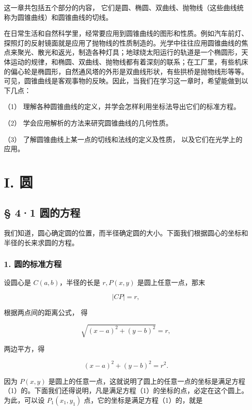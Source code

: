 这一章共包括五个部分的内容，
它们是圆、椭圆、双曲线、抛物线（这些曲线统称为圆锥曲线）和圆锥曲线的切线。

在日常生活和自然科学里，经常要应用到圆锥曲线的图形和性质。例如汽车前灯、探照灯的反射镜面就是应用了抛物线的性质制造的。光学中往往应用圆锥曲线的焦点来聚光、散光和返光，制造各种灯具；地球绕太阳运行的轨道是一个椭圆形，天体运动的规律，和椭圆、双曲线、抛物线都有着深刻的联系；在工厂里，有些机床的偏心轮是椭圆形，自然通风塔的外形是双曲线形状，有些拱桥是抛物线形等等。可见，圆锥曲线是客观事物的反映。因此，当我们在学习这一章时，希望能做到以下几点：

（1） 理解各种圆锥曲线的定义，并学会怎样利用坐标法导出它们的标准方程。

（2） 学会应用解析的方法来研究圆锥曲线的几何性质。

（3） 了解圆锥曲线上某一点的切线和法线的定义及性质，
以及它们在光学上的应用。

\section{I. 圆}\label{i.-ux5706}

\subsection{§ 4·1 圆的方程}\label{ux5706ux7684ux65b9ux7a0b}

我们知道，圆心确定圆的位置，而半径确定圆的大小。下面我们根据圆心的坐标和半径的长来求圆的方程。

\subsubsection{1.
圆的标准方程}\label{ux5706ux7684ux6807ux51c6ux65b9ux7a0b}

设圆心是 \(C(a, b)\)，半径的长是 \(r, P(x, y)\) 是圆上任意一点，那末

\[
\left| CP \right| = r,
\]

根据两点间的距离公式， 得

\[
\sqrt {(x - a) ^ {2} + (y - b) ^ {2}} = r,
\]

两边平方，得

\[
(x - a) ^ {2} + (y - b) ^ {2} = r^{2}. \tag {1}
\]

因为 \(P(x,y)\)
是圆上的任意一点，这就说明了圆上的任意一点的坐标是满足方程（1）的。下面我们还得说明，凡是满足方程（1）的坐标的点，必定在这个圆上。为此，可以设
\(P_{1}(x_{1},y_{1})\) 点，它的坐标是满足方程（1）的，就是

